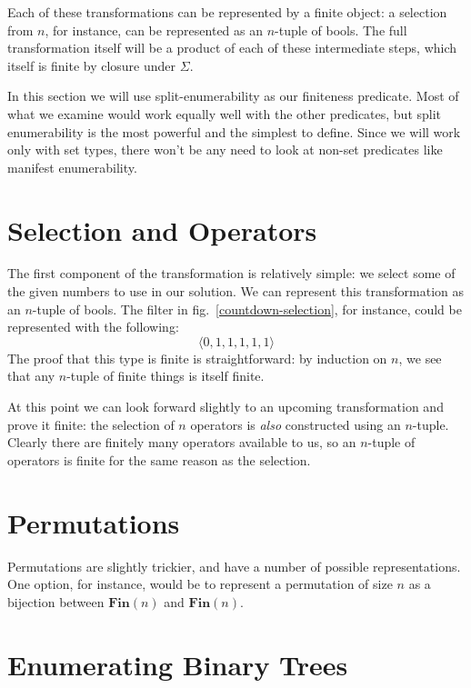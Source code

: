 Each of these transformations can be represented by a finite object: a selection
from \(n\), for instance, can be represented as an \(n\)-tuple of bools.
The full transformation itself will be a product of each of these intermediate
steps, which itself is finite by closure under \(\Sigma\).

In this section we will use split-enumerability as our finiteness predicate.
Most of what we examine would work equally well with the other predicates, but
split enumerability is the most powerful and the simplest to define.
Since we will work only with set types, there won't be any need to look at
non-set predicates like manifest enumerability.
\section{Selection and Operators}
The first component of the transformation is relatively simple: we select some
of the given numbers to use in our solution.
We can represent this transformation as an \(n\)-tuple of bools.
The filter in fig.~\ref{countdown-selection}, for instance, could be represented
with the following:
\begin{equation}
  \langle 0 , 1 , 1 , 1 , 1 , 1  \rangle
\end{equation}
The proof that this type is finite is straightforward: by induction on \(n\), we
see that any \(n\)-tuple of finite things is itself finite.

At this point we can look forward slightly to an upcoming transformation and
prove it finite: the selection of \(n\) operators is \emph{also} constructed
using an \(n\)-tuple.
Clearly there are finitely many operators available to us, so an \(n\)-tuple of
operators is finite for the same reason as the selection.
\section{Permutations}
Permutations are slightly trickier, and have a number of possible
representations.
One option, for instance, would be to represent a permutation of size \(n\) as a
bijection between \(\mathbf{Fin}(n)\) and \(\mathbf{Fin}(n)\).


\section{Enumerating Binary Trees}



